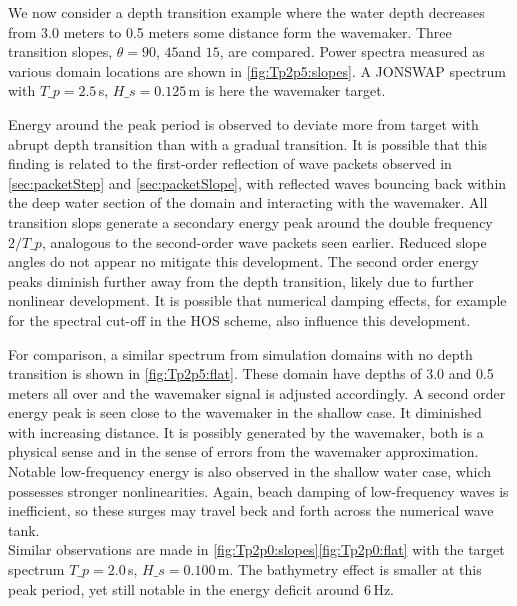 We now consider a depth transition example where the water depth decreases from 3.0 meters to 0.5 meters some distance form the wavemaker. 
Three transition slopes, $\theta = 90$\textdegree, $45$\textdegree and $15$\textdegree, are compared.
Power spectra measured as various domain locations are shown in \autoref{fig:Tp2p5:slopes}.
A JONSWAP spectrum with $T\_p=2.5$\,s, $H\_s=0.125$\,m is here the wavemaker target.

Energy around the peak period is observed to deviate more from target with abrupt depth transition than with a gradual transition. 
It is possible that this finding is related to the first-order reflection of wave packets observed in \autoref{sec:packetStep}  and  \ref{sec:packetSlope}, with reflected waves bouncing back within the deep water section of the domain and interacting with the wavemaker. 
All transition slops generate a secondary energy peak around the double frequency $2/T\_p$, analogous to the second-order wave packets seen earlier. 
Reduced slope angles do not appear no mitigate this development.
The second order energy peaks diminish further away from the depth transition, likely due to further nonlinear development. 
It is possible that numerical damping effects, for example for the spectral cut-off in the HOS scheme, also influence this development. 
 
For comparison, a similar spectrum from simulation domains with no depth transition is shown in \autoref{fig:Tp2p5:flat}.
These domain have depths of 3.0 and 0.5 meters all over and the wavemaker signal is adjusted accordingly. 
A second order energy peak is seen close to the wavemaker in the shallow case. It diminished with increasing distance. 
It is possibly generated by the wavemaker, both is a physical sense and in the sense of errors from the wavemaker approximation.
Notable low-frequency energy is also observed in the shallow water case, which possesses stronger nonlinearities. 
Again, beach damping of low-frequency waves is inefficient, so these surges may travel beck and forth across the numerical wave tank. 
\\

Similar observations are made in  \autoref{fig:Tp2p0:slopes}\ref{fig:Tp2p0:flat} with the target spectrum $T\_p=2.0$\,s, $H\_s=0.100$\,m.
The bathymetry effect is smaller at this peak period, yet still notable in the energy deficit around 6\,Hz.


